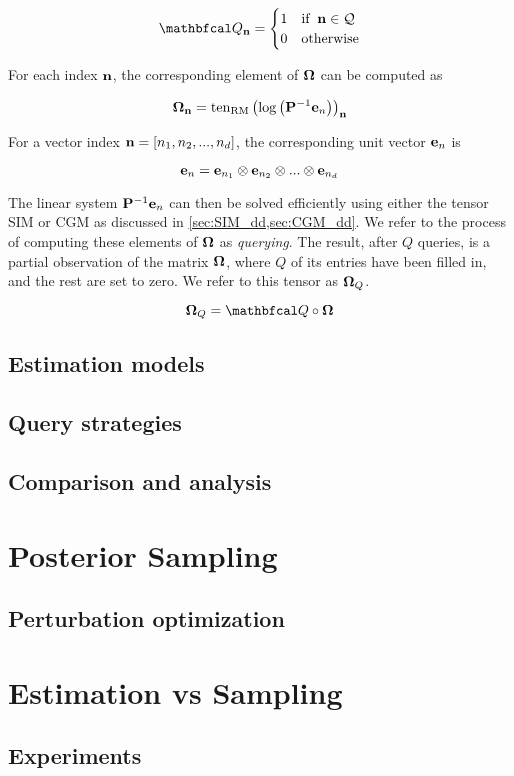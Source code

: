 \begin{equation}
    \Qt_{\nn} = \begin{cases}
        1 & \text{if} \;\; \nn \in \mathcal{Q} \\
        0 & \text{otherwise}
    \end{cases}
\end{equation}


For each index $\mathbf{n}$, the corresponding element of $\mathbf{\Omega}$ can be computed as 

\begin{equation}
    \mathbf{\Omega}_{\mathbf{n}} = \text{\textup{ten}}_{\text{\textup{RM}}}\left(\log \left( \mathbf{P}^{-1} \mathbf{e}_n \right)\right)_{\mathbf{n}}
\end{equation}

For a vector index $\mathbf{n} = [n_1, n_2, ..., n_d]$, the corresponding unit vector $\mathbf{e}_n$ is 

\begin{equation}
\mathbf{e}_n = \mathbf{e}_{n_1} \otimes \mathbf{e}_{n_2} \otimes ... \otimes \mathbf{e}_{n_d}
\end{equation}

The linear system $\mathbf{P}^{-1} \mathbf{e}_n$ can then be solved efficiently using either the tensor SIM or CGM as discussed in \cref{sec:SIM_dd,sec:CGM_dd}. We refer to the process of computing these elements of $\mathbf{\Omega}$ as \textit{querying}. The result, after $Q$ queries, is a partial observation of the matrix $\mathbf{\Omega}$, where $Q$ of its entries have been filled in, and the rest are set to zero. We refer to this tensor as $\mathbf{\Omega}_Q$. 


\begin{equation}
    \OMEGA_Q = \Qt \circ \OMEGA
\end{equation}




\subsection{Estimation models}

\subsection{Query strategies}

\label{sec:query_strats}

\subsection{Comparison and analysis}


\section{Posterior Sampling}

\label{sec:sampling}

\subsection{Perturbation optimization}



\section{Estimation vs Sampling}

\subsection{Experiments}
